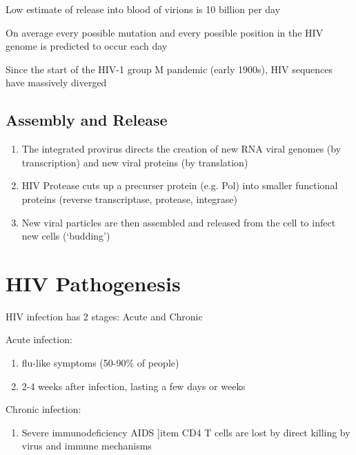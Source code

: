 \documentclass{notes}
\begin{document}
\tab Low estimate of release into blood of virions is 10 billion per day

\tab On average every possible mutation and every possible position in the HIV genome is predicted to occur each day

\tab Since the start of the HIV-1 group M pandemic (early 1900s), HIV sequences have massively diverged


\subsection{Assembly and Release}

\begin{enumerate}
    \item The integrated provirus directs the creation of new RNA viral genomes (by transcription) and new viral proteins (by translation)
    \item HIV Protease cuts up a precurser protein (e.g. Pol) into smaller functional proteins (reverse transcriptase, protease, integrase)
    \item New viral particles are then assembled and released from the cell to infect new cells (`budding')
\end{enumerate}



\section{HIV Pathogenesis}

HIV infection has 2 stages: Acute and Chronic

Acute infection:

\begin{enumerate}
    \item flu-like symptoms (50-90\% of people)
    \item 2-4 weeks after infection, lasting a few days or weeks
\end{enumerate}

Chronic infection:

\begin{enumerate}
    \item Severe immunodeficiency \indicates AIDS
    ]item CD4 T cells are lost by direct killing by virus and immune mechanisms
\end{enumerate}
\end{document}
